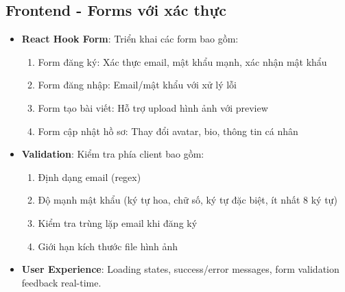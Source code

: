 \documentclass[a4paper]{article}
\begin{document}
    \subsection{Frontend - Forms với xác thực}
    \begin{itemize}
        \item \textbf{React Hook Form}: Triển khai các form bao gồm:
        \begin{enumerate}
            \item Form đăng ký: Xác thực email, mật khẩu mạnh, xác nhận mật khẩu
            \item Form đăng nhập: Email/mật khẩu với xử lý lỗi
            \item Form tạo bài viết: Hỗ trợ upload hình ảnh với preview
            \item Form cập nhật hồ sơ: Thay đổi avatar, bio, thông tin cá nhân
        \end{enumerate}
        \item \textbf{Validation}: Kiểm tra phía client bao gồm:
        \begin{enumerate}
            \item Định dạng email (regex)
            \item Độ mạnh mật khẩu (ký tự hoa, chữ số, ký tự đặc biệt, ít nhất 8 ký tự)
            \item Kiểm tra trùng lặp email khi đăng ký
            \item Giới hạn kích thước file hình ảnh
        \end{enumerate}
        \item \textbf{User Experience}: Loading states, success/error messages, form validation feedback real-time.
    \end{itemize}

\end{document}
